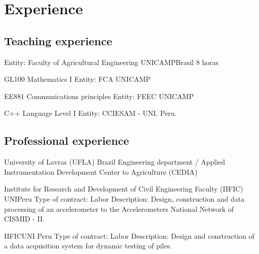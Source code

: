 \documentclass[11pt,a4paper,sans]{moderncv} %
\begin{document}

\section{Experience}

\subsection{Teaching experience}


	      {Entity: Faculty of Agricultural Engineering}
	      {UNICAMP}{Brasil}
	      {8 horas }

			  {GL100 }{Mathematics I}{}
			  {Entity: FCA UNICAMP }

			  {EE881 }{Communications principles}{}
			  {Entity: FEEC UNICAMP }

	      {C++ Language}{ Level I}{}
	      {Entity: CCIESAM - UNI. Peru.}

\subsection{Professional experience}
	      {University of Lavras (UFLA)}
	      {}{Brazil}
	      {Engineering department / Applied Instrumentation Development Center to Agriculture (CEDIA) }


		      {Institute for Research and Development of Civil Engineering Faculty (IIFIC)}
		      {UNI}{Peru}
		      {Type of contract: Labor\newline{}
		      Description: Design, construction and data processing of an accelerometer 
		      to the Accelerometers National Network  of CISMID - II.}

		      {IIFIC}{UNI }{Peru}
		      {Type of contract: Labor\newline{}
		      Description: Design and construction  of  a data acquisition system for dynamic testing of piles.}
\end{document}
